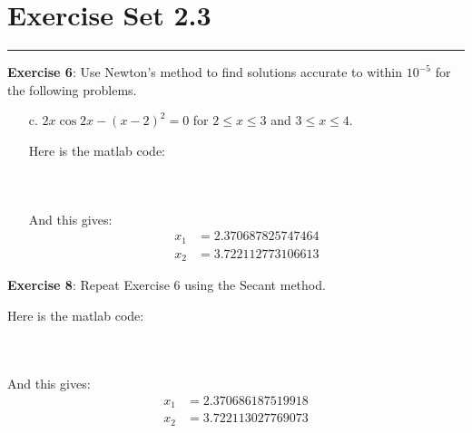 \documentclass{article}
\begin{document}
\newpage
\section*{Exercise Set 2.3}
\hrule

\textbf{Exercise 6}: Use Newton's method to find solutions accurate to within $10^{-5}$ for the following problems.
    \begin{itemize}
        \item [c.] $2x\cos{2x} - (x - 2)^{2} = 0$ for $2 \leq x \leq 3$ and $3 \leq x \leq 4$.
            \begin{answer}
                Here is the matlab code:
                \inputminted{matlab}{newton/newton.m}
                \inputminted{matlab}{newton/myfunc1.m}
                \inputminted{matlab}{newton/script1.m}
                And this gives:
                    \begin{align*}
                        x_{1} &= 2.370687825747464 \\
                        x_{2} &= 3.722112773106613
                    \end{align*}
            \end{answer}
    \end{itemize}

\textbf{Exercise 8}: Repeat Exercise $6$ using the Secant method.
    \begin{answer}
        Here is the matlab code:
        \inputminted{matlab}{secant/secant.m}
        \inputminted{matlab}{secant/myfunc1.m}
        \inputminted{matlab}{secant/script.m}
        And this gives:
            \begin{align*}
                x_{1} &= 2.370686187519918 \\
                x_{2} &= 3.722113027769073   
            \end{align*}
    \end{answer}
\end{document}
